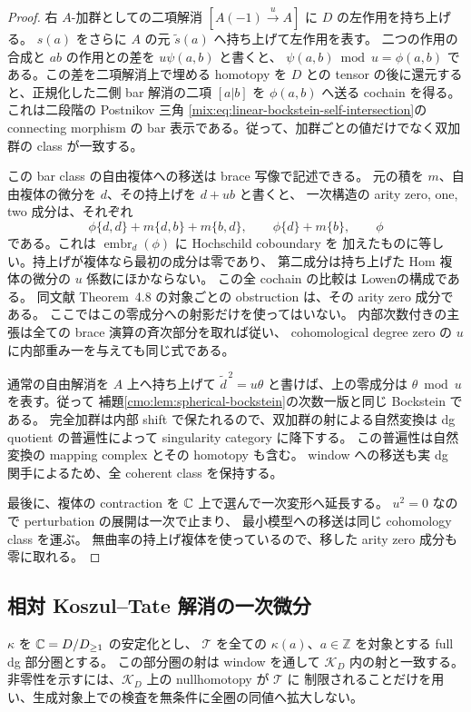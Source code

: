 \begin{proof}
右 $A$-加群としての二項解消
$[A(-1)\xrightarrow{u}A]$ に $D$ の左作用を持ち上げる。
$s(a)$ をさらに $A$ の元 $\widetilde s(a)$ へ持ち上げて左作用を表す。
二つの作用の合成と $ab$ の作用との差を $u\psi(a,b)$ と書くと、
$\psi(a,b)\bmod u=\phi(a,b)$ である。この差を二項解消上で埋める homotopy を
$D$ との tensor の後に還元すると、正規化した二側 bar 解消の二項
$[a|b]$ を $\phi(a,b)$ へ送る cochain を得る。
これは二段階の Postnikov 三角
\eqref{mix:eq:linear-bockstein-self-intersection}の connecting morphism の
bar 表示である。従って、加群ごとの値だけでなく双加群の class が一致する。

この bar class の自由複体への移送は brace 写像で記述できる。
元の積を $m$、自由複体の微分を $d$、その持上げを $d+ub$ と書くと、
一次構造の arity zero, one, two 成分は、それぞれ
\[
 \phi\{d,d\}+m\{d,b\}+m\{b,d\},\qquad
 \phi\{d\}+m\{b\},\qquad \phi
\]
である。これは $\operatorname{embr}_d(\phi)$ に Hochschild coboundary を
加えたものに等しい。持上げが複体なら最初の成分は零であり、
第二成分は持ち上げた Hom 複体の微分の $u$ 係数にほかならない。
この全 cochain の比較は
Lowen\cite[Theorems~3.21, 4.15]{CMOLowenCharacteristic}の構成である。
同文献 Theorem~4.8 の対象ごとの obstruction は、その arity zero 成分である。
ここではこの零成分への射影だけを使ってはいない。
内部次数付きの主張は全ての brace 演算の斉次部分を取れば従い、
cohomological degree zero の $u$ に内部重み一を与えても同じ式である。

通常の自由解消を $A$ 上へ持ち上げて
$\widetilde d^{\,2}=u\theta$ と書けば、上の零成分は
$\theta\bmod u$ を表す。従って
補題\ref{cmo:lem:spherical-bockstein}の次数一版と同じ Bockstein である。
完全加群は内部 shift で保たれるので、双加群の射による自然変換は
dg quotient の普遍性によって singularity category に降下する。
この普遍性は自然変換の mapping complex とその homotopy も含む。
window への移送も実 dg 関手によるため、全 coherent class を保持する。

最後に、複体の contraction を $\mathbb C$ 上で選んで一次変形へ延長する。
$u^2=0$ なので perturbation の展開は一次で止まり、
最小模型への移送は同じ cohomology class を運ぶ。
無曲率の持上げ複体を使っているので、移した arity zero 成分も零に取れる。
\end{proof}

\subsection{相対 Koszul--Tate 解消の一次微分}

$\kappa$ を $\mathbb C=D/D_{\ge1}$ の安定化とし、
$\mathcal T$ を全ての $\kappa(a)$、$a\in\mathbb Z$ を対象とする full dg 部分圏とする。
この部分圏の射は window を通して $\mathcal K_D$ 内の射と一致する。
非零性を示すには、$\mathcal K_D$ 上の nullhomotopy が $\mathcal T$ に
制限されることだけを用い、生成対象上での検査を無条件に全圏の同値へ拡大しない。

